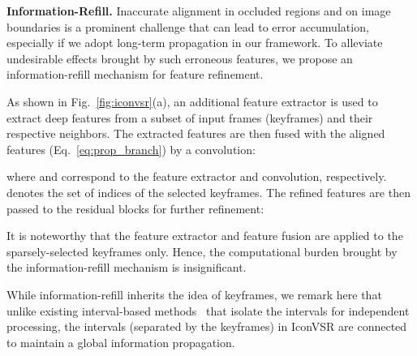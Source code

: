\documentclass[final]{cvpr}
\begin{document}
\noindent\textbf{Information-Refill.}
Inaccurate alignment in occluded regions and on image boundaries is a prominent challenge that can lead to error accumulation, especially if we adopt long-term propagation in our framework. To alleviate undesirable effects brought by such erroneous features, we propose an information-refill mechanism for feature refinement.

As shown in Fig.~\ref{fig:iconvsr}(a), an additional feature extractor is used to extract deep features from a subset of input frames (keyframes) and their respective neighbors. The extracted features are then fused with the aligned features  (Eq.~\ref{eq:prop_branch}) by a convolution:

where  and  correspond to the feature extractor and convolution, respectively.  denotes the set of indices of the selected keyframes.
The refined features are then passed to the residual blocks for further refinement:

It is noteworthy that the feature extractor and feature fusion are applied to the sparsely-selected keyframes only. Hence, the computational burden brought by the information-refill mechanism is insignificant.

While information-refill inherits the idea of keyframes, we remark here that unlike existing interval-based methods~\cite{jain2019accel,zhang2017fast} that isolate the intervals for independent processing, the intervals (separated by the keyframes) in \mbox{IconVSR} are connected to maintain a global information propagation.
\end{document}
